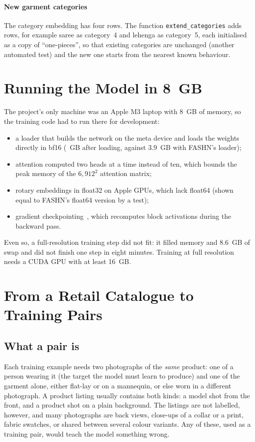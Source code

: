 \paragraph{New garment categories} The category embedding has four rows. The function \texttt{extend\_\allowbreak categories} adds rows, for example saree as category~4 and lehenga as category~5, each initialised as a copy of ``one-pieces'', so that existing categories are unchanged (another automated test) and the new one starts from the nearest known behaviour.

\section{Running the Model in 8~GB}

The project's only machine was an Apple M3 laptop with 8~GB of memory, so the training code had to run there for development:
\begin{itemize}
\item a loader that builds the network on the meta device and loads the weights directly in bf16 (\vMemLoad{}~GB after loading, against 3.9~GB with FASHN's loader);
\item attention computed two heads at a time instead of ten, which bounds the peak memory of the $6{,}912^2$ attention matrix;
\item rotary embeddings in float32 on Apple GPUs, which lack float64 (shown equal to FASHN's float64 version by a test);
\item gradient checkpointing~\cite{checkpoint}, which recomputes block activations during the backward pass.
\end{itemize}
Even so, a full-resolution training step did not fit: it filled memory and 8.6~GB of swap and did not finish one step in eight minutes. Training at full resolution needs a CUDA GPU with at least 16~GB.

\section{From a Retail Catalogue to Training Pairs}
\label{sec:pairs}

\subsection{What a pair is}

Each training example needs two photographs of the \emph{same} product: one of a person wearing it (the target the model must learn to produce) and one of the garment alone, either flat-lay or on a mannequin, or else worn in a different photograph. A product listing usually contains both kinds: a model shot from the front, and a product shot on a plain background. The listings are not labelled, however, and many photographs are back views, close-ups of a collar or a print, fabric swatches, or shared between several colour variants. Any of these, used as a training pair, would teach the model something wrong.

